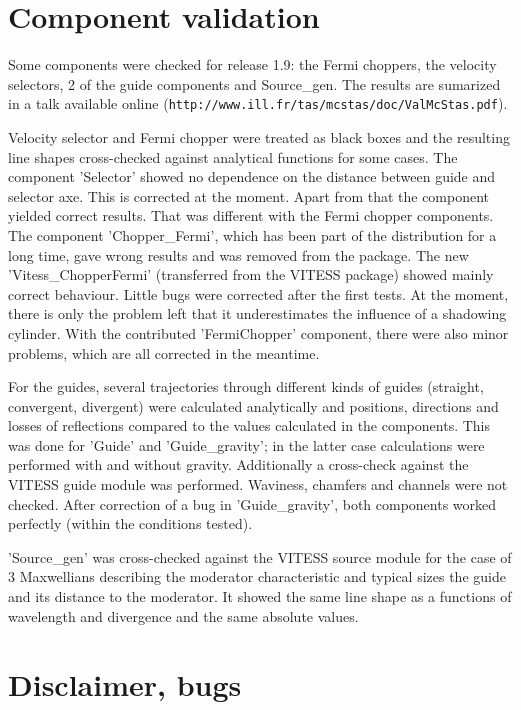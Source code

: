 \section{Component validation}

Some components were checked for release 1.9: the Fermi choppers, the velocity selectors, 2 of the guide components and Source\_gen. The results are sumarized in a talk available online (\verb+http://www.ill.fr/tas/mcstas/doc/ValMcStas.pdf+).

Velocity selector and Fermi chopper were treated as black boxes and the resulting line shapes cross-checked against analytical functions for some cases.
The component 'Selector' showed no dependence on the distance between guide and selector axe. This is corrected at the moment. Apart from that the component yielded correct results.
That was different with the Fermi chopper components. The component 'Chopper\_Fermi', which has been part of the \MCS distribution for a long time, gave wrong results and was removed from the package. The new 'Vitess\_ChopperFermi' (transferred from the VITESS package) showed mainly correct behaviour. Little bugs were corrected after the first tests. At the moment, there is only the problem left that it underestimates the influence of a shadowing cylinder. With the contributed 'FermiChopper' component, there were also minor problems, which are all corrected in the meantime.

For the guides, several trajectories through different kinds of guides (straight, convergent, divergent) were calculated analytically and positions, directions and losses of reflections compared to the values calculated in the components. This was done for 'Guide' and 'Guide\_gravity'; in the latter case calculations were performed with and without gravity. Additionally a cross-check against the VITESS guide module was performed. Waviness, chamfers and channels were not checked.
After correction of a bug in 'Guide\_gravity', both components worked perfectly (within the conditions tested).

'Source\_gen' was cross-checked against the VITESS source module for the case of 3 Maxwellians describing the moderator characteristic and typical sizes the guide and its distance to the moderator. It showed the same line shape as a functions of wavelength and divergence and the same absolute values.

\section{Disclaimer, bugs}


